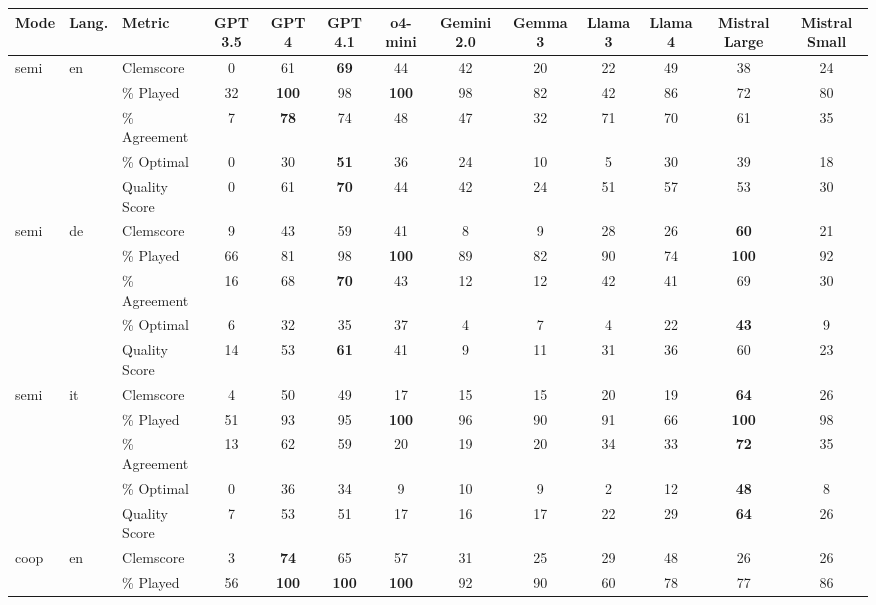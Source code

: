 \begin{table}[ht]
  \footnotesize
  \begin{widepage}
    \centering
    \addtolength{\tabcolsep}{-0.2em}
    \begin{tabular}{lllcccccccccc}
      \hline
      Mode & Lang. & Metric & GPT 3.5 & GPT 4 & GPT 4.1 & o4-mini & Gemini 2.0 & Gemma 3 & Llama 3 & Llama 4 & Mistral Large & Mistral Small \\
      \hline
      semi & en & Clemscore & 0 & 61 & \textbf{69} & 44 & 42 & 20 & 22 & 49 & 38 & 24 \\
       &  & \% Played & 32 & \textbf{100} & 98 & \textbf{100} & 98 & 82 & 42 & 86 & 72 & 80 \\
       &  & \% Agreement & 7 & \textbf{78} & 74 & 48 & 47 & 32 & 71 & 70 & 61 & 35 \\
       &  & \% Optimal & 0 & 30 & \textbf{51} & 36 & 24 & 10 & 5 & 30 & 39 & 18 \\
       &  & Quality Score & 0 & 61 & \textbf{70} & 44 & 42 & 24 & 51 & 57 & 53 & 30 \\
       \hline
      semi & de & Clemscore & 9 & 43 & 59 & 41 & 8 & 9 & 28 & 26 & \textbf{60} & 21 \\
       &  & \% Played & 66 & 81 & 98 & \textbf{100} & 89 & 82 & 90 & 74 & \textbf{100} & 92 \\
       &  & \% Agreement & 16 & 68 & \textbf{70} & 43 & 12 & 12 & 42 & 41 & 69 & 30 \\
       &  & \% Optimal & 6 & 32 & 35 & 37 & 4 & 7 & 4 & 22 & \textbf{43} & 9 \\
       &  & Quality Score & 14 & 53 & \textbf{61} & 41 & 9 & 11 & 31 & 36 & 60 & 23 \\
      \hline
      semi & it & Clemscore & 4 & 50 & 49 & 17 & 15 & 15 & 20 & 19 & \textbf{64} & 26 \\
       &  & \% Played & 51 & 93 & 95 & \textbf{100} & 96 & 90 & 91 & 66 & \textbf{100} & 98 \\
       &  & \% Agreement & 13 & 62 & 59 & 20 & 19 & 20 & 34 & 33 & \textbf{72} & 35 \\
       &  & \% Optimal & 0 & 36 & 34 & 9 & 10 & 9 & 2 & 12 & \textbf{48} & 8 \\
       &  & Quality Score & 7 & 53 & 51 & 17 & 16 & 17 & 22 & 29 & \textbf{64} & 26 \\
      \hline
      coop & en & Clemscore & 3 & \textbf{74} & 65 & 57 & 31 & 25 & 29 & 48 & 26 & 26 \\
       &  & \% Played & 56 & \textbf{100} & \textbf{100} & \textbf{100} & 92 & 90 & 60 & 78 & 77 & 86 \\

\end{tabular}
\end{widepage}
\end{table}
